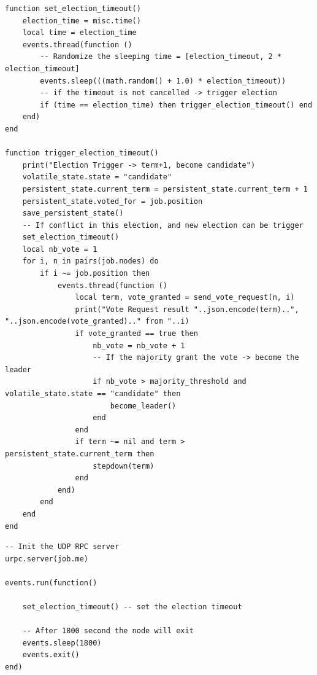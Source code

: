 \documentclass{eplmastersthesis}
\begin{document}
        \begin{minipage}{\linewidth}
        \begin{lstlisting}[style=MySmallLua,caption={Timeout/Trigger functions}]
function set_election_timeout()
    election_time = misc.time()
    local time = election_time
    events.thread(function ()
        -- Randomize the sleeping time = [election_timeout, 2 * election_timeout]
        events.sleep(((math.random() + 1.0) * election_timeout))
        -- if the timeout is not cancelled -> trigger election
        if (time == election_time) then trigger_election_timeout() end
    end)
end

function trigger_election_timeout()
    print("Election Trigger -> term+1, become candidate")
    volatile_state.state = "candidate"
    persistent_state.current_term = persistent_state.current_term + 1
    persistent_state.voted_for = job.position
    save_persistent_state()
    -- If conflict in this election, and new election can be trigger
    set_election_timeout()
    local nb_vote = 1
    for i, n in pairs(job.nodes) do
        if i ~= job.position then
            events.thread(function ()
                local term, vote_granted = send_vote_request(n, i)
                print("Vote Request result "..json.encode(term)..", "..json.encode(vote_granted).." from "..i)
                if vote_granted == true then
                    nb_vote = nb_vote + 1
                    -- If the majority grant the vote -> become the leader
                    if nb_vote > majority_threshold and volatile_state.state == "candidate" then
                        become_leader()
                    end
                end
                if term ~= nil and term > persistent_state.current_term then
                    stepdown(term)
                end
            end)
        end
    end
end
        \end{lstlisting}
        \end{minipage}

        \begin{minipage}{\linewidth}
        \begin{lstlisting}[style=MySmallLua,caption={Main}]
-- Init the UDP RPC server
urpc.server(job.me)

events.run(function()

    set_election_timeout() -- set the election timeout

    -- After 1800 second the node will exit
    events.sleep(1800)
    events.exit()
end)
        \end{lstlisting}
        \end{minipage}
\end{document}
